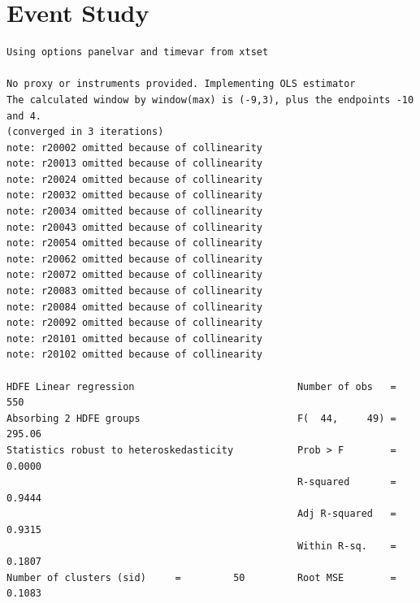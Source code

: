 \documentclass[
]{book}
\newenvironment{Shaded}{\begin{snugshade}}{\end{snugshade}}
\newcommand{\FunctionTok}[1]{\textcolor[rgb]{0.13,0.29,0.53}{\textbf{#1}}}
\newcommand{\KeywordTok}[1]{\textcolor[rgb]{0.13,0.29,0.53}{\textbf{#1}}}
\newcommand{\NormalTok}[1]{#1}
\newcommand{\OtherTok}[1]{\textcolor[rgb]{0.56,0.35,0.01}{#1}}
\begin{document}
\section{Event Study}\label{event-study}

\begin{Shaded}
\end{Shaded}

\begin{verbatim}
Using options panelvar and timevar from xtset

No proxy or instruments provided. Implementing OLS estimator
The calculated window by window(max) is (-9,3), plus the endpoints -10 and 4.
(converged in 3 iterations)
note: r20002 omitted because of collinearity
note: r20013 omitted because of collinearity
note: r20024 omitted because of collinearity
note: r20032 omitted because of collinearity
note: r20034 omitted because of collinearity
note: r20043 omitted because of collinearity
note: r20054 omitted because of collinearity
note: r20062 omitted because of collinearity
note: r20072 omitted because of collinearity
note: r20083 omitted because of collinearity
note: r20084 omitted because of collinearity
note: r20092 omitted because of collinearity
note: r20101 omitted because of collinearity
note: r20102 omitted because of collinearity

HDFE Linear regression                            Number of obs   =        550
Absorbing 2 HDFE groups                           F(  44,     49) =     295.06
Statistics robust to heteroskedasticity           Prob > F        =     0.0000
                                                  R-squared       =     0.9444
                                                  Adj R-squared   =     0.9315
                                                  Within R-sq.    =     0.1807
Number of clusters (sid)     =         50         Root MSE        =     0.1083


\end{verbatim}
\end{document}
